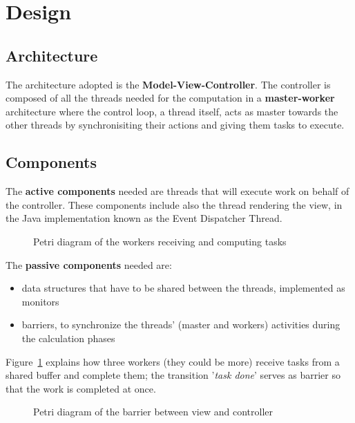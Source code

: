\documentclass{scrartcl}
\begin{document}
\section{Design}\label{sec:design}
\subsection{Architecture}
The architecture adopted is the \textbf{Model-View-Controller}. The controller is composed
of all the threads needed for the computation in a \textbf{master-worker} architecture
where the control loop, a thread itself, acts as master towards the other threads
by synchronisiting their actions and giving them tasks to execute.

\subsection{Components}\label{sec:comp}
The \textbf{active components} needed are threads that will execute work on behalf 
of the controller. These components include also the thread rendering the view, in
the Java implementation known as the Event Dispatcher Thread.

\begin{figure}[H]
    
    \centering
    \caption{Petri diagram of the workers receiving and computing tasks}\label{fig:workers-petri}
\end{figure}

The \textbf{passive components} needed are:
\begin{itemize}
    \item data structures that have to be shared between the threads,
        implemented as monitors
    \item barriers, to synchronize the threads' (master and workers) activities during 
        the calculation phases 
\end{itemize}

Figure~\ref{fig:workers-petri} explains how three workers (they could be more) receive
tasks from a shared buffer and complete them; the transition '\textit{task done}' serves
as barrier so that the work is completed at once.

\begin{figure}[H]
    \centering
    
    \caption{Petri diagram of the barrier between view and controller}\label{fig:vc-barrier}
\end{figure}
\end{document}
